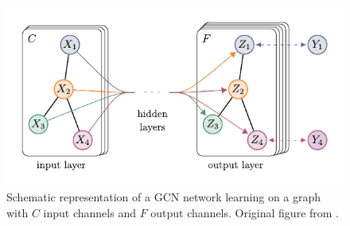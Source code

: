 \begin{figure}
	\includegraphics[width=0.8\linewidth]{images/GCN.pdf}
	\caption{Schematic representation of a GCN network learning on a graph with \( C \) input channels and \( F \) output channels. Original figure from \cite{kipf_semi-supervised_2017}.}
	\label{fig:GCN}
\end{figure}

